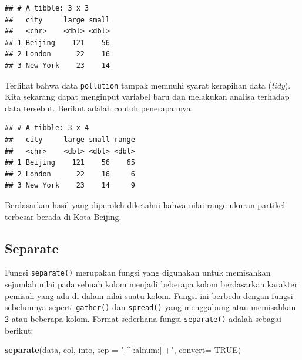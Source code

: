 \documentclass[]{book}
\newenvironment{Shaded}{\begin{snugshade}}{\end{snugshade}}
\newcommand{\KeywordTok}[1]{\textcolor[rgb]{0.13,0.29,0.53}{\textbf{#1}}}
\newcommand{\DataTypeTok}[1]{\textcolor[rgb]{0.13,0.29,0.53}{#1}}
\newcommand{\StringTok}[1]{\textcolor[rgb]{0.31,0.60,0.02}{#1}}
\newcommand{\CommentTok}[1]{\textcolor[rgb]{0.56,0.35,0.01}{\textit{#1}}}
\newcommand{\OtherTok}[1]{\textcolor[rgb]{0.56,0.35,0.01}{#1}}
\newcommand{\OperatorTok}[1]{\textcolor[rgb]{0.81,0.36,0.00}{\textbf{#1}}}
\newcommand{\NormalTok}[1]{#1}
\begin{document}
\begin{verbatim}
## # A tibble: 3 x 3
##   city     large small
##   <chr>    <dbl> <dbl>
## 1 Beijing    121    56
## 2 London      22    16
## 3 New York    23    14
\end{verbatim}

Terlihat bahwa data \texttt{pollution} tampak memnuhi syarat kerapihan
data (\emph{tidy}). Kita sekarang dapat menginput variabel baru dan
melakukan analisa terhadap data tersebut. Berikut adalah contoh
penerapannya:

\begin{Shaded}
\end{Shaded}

\begin{verbatim}
## # A tibble: 3 x 4
##   city     large small range
##   <chr>    <dbl> <dbl> <dbl>
## 1 Beijing    121    56    65
## 2 London      22    16     6
## 3 New York    23    14     9
\end{verbatim}

Berdasarkan hasil yang diperoleh diketahui bahwa nilai range ukuran
partikel terbesar berada di Kota Beijing.

\subsection{Separate}\label{separate}

Fungsi \texttt{separate()} merupakan fungsi yang digunakan untuk
memisahkan sejumlah nilai pada sebuah kolom menjadi beberapa kolom
berdasarkan karakter pemisah yang ada di dalam nilai suatu kolom. Fungsi
ini berbeda dengan fungsi sebelumnya seperti \texttt{gather()} dan
\texttt{spread()} yang menggabung atau memisahkan 2 atau beberapa kolom.
Format sederhana fungsi \texttt{separate()} adalah sebagai berikut:

\begin{Shaded}
\begin{Highlighting}[]
\KeywordTok{separate}\NormalTok{(data, col, into, }\DataTypeTok{sep =} \StringTok{"[^[:alnum:]]+"}\NormalTok{, }\DataTypeTok{convert=} \OtherTok{TRUE}\NormalTok{)}
\end{Highlighting}
\end{Shaded}
\end{document}
